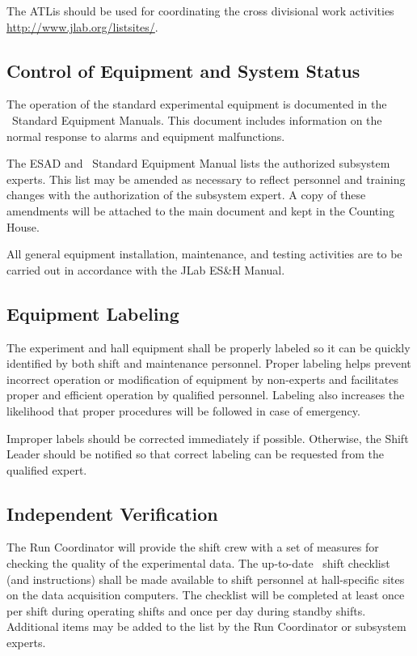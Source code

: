 \documentclass[11pt]{article}
\begin{document}
The ATLis should be used for coordinating the cross divisional work activities
\url{http://www.jlab.org/listsites/}. 

\subsection{Control of Equipment and System Status}
\indent

The operation of the standard experimental equipment is documented in the 
\HALL\ Standard Equipment Manuals.
This document includes information on the
normal response to alarms and equipment malfunctions.
 
The ESAD and \HALL\ Standard Equipment Manual lists 
the authorized subsystem experts. This list may be amended as necessary to 
reflect personnel and training changes with the 
authorization of the subsystem expert. A copy of these 
amendments will be attached to the main document and kept in the
Counting House.

All general equipment installation, maintenance, and testing activities 
are to be carried out in accordance with the JLab ES\&H Manual.

\subsection{Equipment Labeling}
\indent

The experiment and hall equipment shall be properly labeled so 
it can be quickly identified by both shift and maintenance personnel.
Proper labeling helps prevent incorrect operation or modification of
equipment by non-experts and facilitates proper and efficient operation by
qualified personnel. Labeling also increases the likelihood that 
proper procedures will be followed in case of emergency.

Improper labels should be corrected immediately if possible.
Otherwise, the Shift Leader should be notified so that correct 
labeling can be requested from the qualified expert.


\subsection{Independent Verification}
\indent
	
The Run Coordinator will provide the shift crew with a set of 
measures for checking the quality of the experimental data.  
The up-to-date \HALL\ shift 
checklist (and instructions) shall be made available to shift personnel
at hall-specific sites on the data acquisition  computers.
The checklist will be completed at least once per shift during operating 
shifts and once per day during standby shifts. Additional items may be 
added to the list by the Run Coordinator or subsystem experts.
\end{document}
